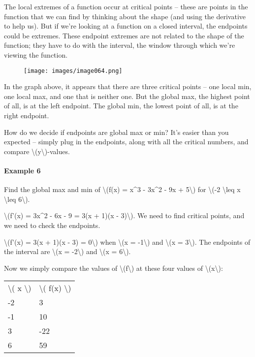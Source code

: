 The local extremes of a function occur at critical points -- these are
points in the function that we can find by thinking about the shape (and
using the derivative to help us). But if we're looking at a function on
a closed interval, the endpoints could be extremes. These endpoint
extremes are not related to the shape of the function; they have to do
with the interval, the window through which we're viewing the function.

\begin{figure}
\centering
\texttt{[image: images/image064.png]}
\caption{}
\end{figure}

In the graph above, it appears that there are three critical points --
one local min, one local max, and one that is neither one. But the
global max, the highest point of all, is at the left endpoint. The
global min, the lowest point of all, is at the right endpoint.

How do we decide if endpoints are global max or min? It's easier than
you expected -- simply plug in the endpoints, along with all the
critical numbers, and compare
\textbackslash{}(y\textbackslash{})-values.

\hypertarget{example-6}{%
\paragraph{Example 6}\label{example-6}}

Find the global max and min of \textbackslash{}(f(x) = x\^{}3 - 3x\^{}2
- 9x + 5\textbackslash{}) for \textbackslash{}(-2 \textbackslash{}leq x
\textbackslash{}leq 6\textbackslash{}).

\textbackslash{}(f'(x) = 3x\^{}2 - 6x - 9 = 3(x + 1)(x -
3)\textbackslash{}). We need to find critical points, and we need to
check the endpoints.

\textbackslash{}(f'(x) = 3(x + 1)(x - 3) = 0\textbackslash{}) when
\textbackslash{}(x = -1\textbackslash{}) and \textbackslash{}(x =
3\textbackslash{}). The endpoints of the interval are \textbackslash{}(x
= -2\textbackslash{}) and \textbackslash{}(x = 6\textbackslash{}).

Now we simply compare the values of \textbackslash{}(f\textbackslash{})
at these four values of \textbackslash{}(x\textbackslash{}):

\begin{longtable}[]{@{}ll@{}}
\toprule
\endhead
\textbackslash{}( x \textbackslash{}) & \textbackslash{}( f(x)
\textbackslash{})\tabularnewline
-2 & 3\tabularnewline
-1 & 10\tabularnewline
3 & -22\tabularnewline
6 & 59\tabularnewline
\bottomrule
\end{longtable}

